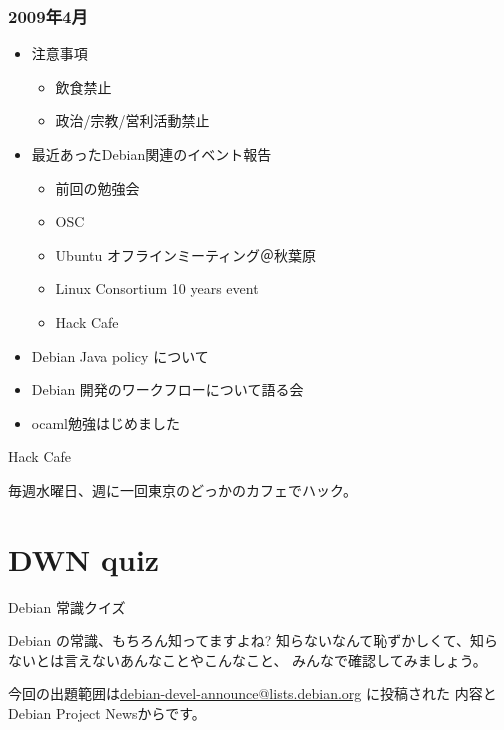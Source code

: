 \begin{frame}
 \frametitle{2009年4月}
\begin{minipage}[t]{0.45\hsize}
  \begin{itemize}
  \item 注意事項
	\begin{itemize}
	 \item 飲食禁止
	 \item 政治/宗教/営利活動禁止
	\end{itemize}
  \item 最近あったDebian関連のイベント報告
	\begin{itemize}
	 \item 前回の勉強会
	 \item OSC
	 \item Ubuntu オフラインミーティング＠秋葉原
	 \item Linux Consortium 10 years event
	 \item Hack Cafe
	\end{itemize}
 \end{itemize}
\end{minipage} 
\begin{minipage}[t]{0.45\hsize}
 \begin{itemize}
  \item Debian Java policy について
  \item Debian 開発のワークフローについて語る会
  \item ocaml勉強はじめました
 \end{itemize}
\end{minipage}
\end{frame}

\begin{frame}{Hack Cafe}

毎週水曜日、週に一回東京のどっかのカフェでハック。

\end{frame}

\section{DWN quiz}
\begin{frame}{Debian 常識クイズ}

Debian の常識、もちろん知ってますよね?
知らないなんて恥ずかしくて、知らないとは言えないあんなことやこんなこと、
みんなで確認してみましょう。

今回の出題範囲は\url{debian-devel-announce@lists.debian.org} に投稿された
内容とDebian Project Newsからです。

\end{frame}


